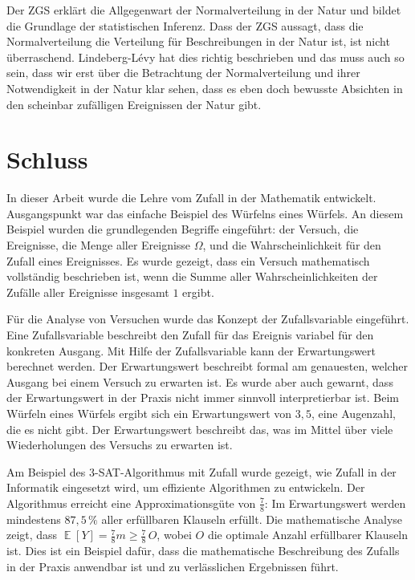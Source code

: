 ﻿\documentclass[12pt,a4paper]{article}
\theoremstyle{definition}
\theoremstyle{plain}
\theoremstyle{remark}
\DeclareMathOperator{\E}{\mathbb{E}}
\begin{document}
Der ZGS erklärt die Allgegenwart der Normalverteilung in der Natur und bildet die Grundlage der statistischen Inferenz. Dass der ZGS aussagt, dass die Normalverteilung die Verteilung für Beschreibungen in der Natur ist, ist nicht überraschend. Lindeberg-Lévy hat dies richtig beschrieben und das muss auch so sein, dass wir erst über die Betrachtung der Normalverteilung und ihrer Notwendigkeit in der Natur klar sehen, dass es eben doch bewusste Absichten in den scheinbar zufälligen Ereignissen der Natur gibt.

\section{Schluss}
\label{sec:schluss}

In dieser Arbeit wurde die Lehre vom Zufall in der Mathematik entwickelt.
Ausgangspunkt war das einfache Beispiel des Würfelns eines Würfels. An diesem
Beispiel wurden die grundlegenden Begriffe eingeführt: der Versuch, die
Ereignisse, die Menge aller Ereignisse $\Omega$, und die Wahrscheinlichkeit
für den Zufall eines Ereignisses. Es wurde gezeigt, dass ein Versuch
mathematisch vollständig beschrieben ist, wenn die Summe aller
Wahrscheinlichkeiten der Zufälle aller Ereignisse insgesamt $1$ ergibt.

Für die Analyse von Versuchen wurde das Konzept der Zufallsvariable
eingeführt. Eine Zufallsvariable beschreibt den Zufall für das Ereignis
variabel für den konkreten Ausgang. Mit Hilfe der Zufallsvariable kann der
Erwartungswert berechnet werden. Der Erwartungswert beschreibt formal am
genauesten, welcher Ausgang bei einem Versuch zu erwarten ist. Es wurde aber
auch gewarnt, dass der Erwartungswert in der Praxis nicht immer sinnvoll
interpretierbar ist. Beim Würfeln eines Würfels ergibt sich ein
Erwartungswert von $3{,}5$, eine Augenzahl, die es nicht gibt. Der
Erwartungswert beschreibt das, was im Mittel über viele Wiederholungen des
Versuchs zu erwarten ist.

Am Beispiel des 3-SAT-Algorithmus mit Zufall wurde gezeigt, wie Zufall in
der Informatik eingesetzt wird, um effiziente Algorithmen zu entwickeln. Der
Algorithmus erreicht eine Approximationsgüte von $\frac{7}{8}$: Im
Erwartungswert werden mindestens $87{,}5\,\%$ aller erfüllbaren Klauseln
erfüllt. Die mathematische Analyse zeigt, dass
$\E[Y] = \frac{7}{8}m \ge \frac{7}{8}\,O$, wobei $O$ die optimale Anzahl
erfüllbarer Klauseln ist. Dies ist ein Beispiel dafür, dass die
mathematische Beschreibung des Zufalls in der Praxis anwendbar ist und zu
verlässlichen Ergebnissen führt.
\end{document}

